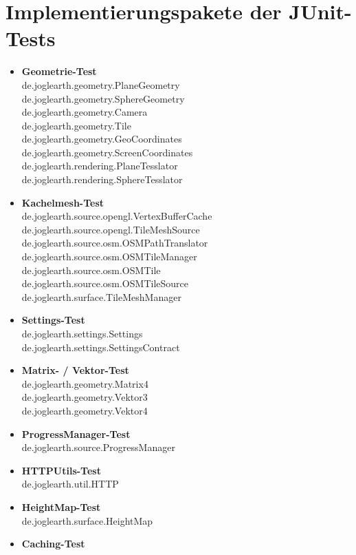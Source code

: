 \documentclass[10pt]{scrreprt}
\begin{document}
\section{Implementierungspakete der JUnit-Tests}
\begin{itemize}
 \item \textbf{Geometrie-Test}\\
 de.joglearth.geometry.PlaneGeometry\\
 de.joglearth.geometry.SphereGeometry\\
 de.joglearth.geometry.Camera\\
 de.joglearth.geometry.Tile\\
 de.joglearth.geometry.GeoCoordinates\\
 de.joglearth.geometry.ScreenCoordinates\\
 de.joglearth.rendering.PlaneTesslator\\
 de.joglearth.rendering.SphereTesslator
 \item \textbf{Kachelmesh-Test}\\
 de.joglearth.source.opengl.VertexBufferCache\\
 de.joglearth.source.opengl.TileMeshSource\\
 de.joglearth.source.osm.OSMPathTranslator\\
 de.joglearth.source.osm.OSMTileManager\\
 de.joglearth.source.osm.OSMTile\\
 de.joglearth.source.osm.OSMTileSource\\
 de.joglearth.surface.TileMeshManager
 \item \textbf{Settings-Test}\\
 de.joglearth.settings.Settings\\
 de.joglearth.settings.SettingsContract
 \item \textbf{Matrix- / Vektor-Test}\\
 de.joglearth.geometry.Matrix4\\
 de.joglearth.geometry.Vektor3\\
 de.joglearth.geometry.Vektor4
 \item \textbf{ProgressManager-Test}\\
 de.joglearth.source.ProgressManager
 \item \textbf{HTTPUtils-Test}\\
 de.joglearth.util.HTTP
 \item \textbf{HeightMap-Test}\\
 de.joglearth.surface.HeightMap
 \item \textbf{Caching-Test}\\

\end{itemize}
\end{document}
